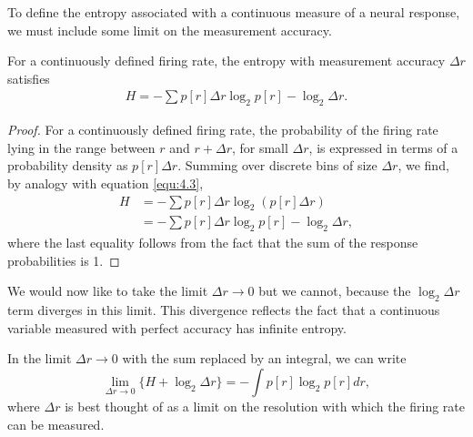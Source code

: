 \begin{rem}
  To define the entropy associated with a continuous measure of a neural response, we must include some limit on the measurement accuracy.
\end{rem}


\begin{prop}
  For a continuously defined firing rate, the entropy with measurement accuracy $\Delta r$ satisfies
  \begin{equation}
    \label{equ:4.16}
    \begin{aligned}
      H = -\sum{p[r]\Delta r\log_2p[r]}-\log_2\Delta r.  
    \end{aligned}
  \end{equation}
  \begin{proof}
    For a continuously defined firing rate, the probability of the firing rate lying in the range between $r$ and $r+\Delta r$, for small $\Delta r$, is expressed in terms of a probability density as $p[r]\Delta r$. Summing over discrete bins of size $\Delta r$, we find, by analogy with equation \ref{equ:4.3},
    \begin{displaymath}
      \begin{aligned}
        H&= -\sum{p[r]\Delta r\log_2(p[r]\Delta r)}\\
        &= -\sum{p[r]\Delta r\log_2p[r]}-\log_2\Delta r,
      \end{aligned}
    \end{displaymath}
    where the last equality follows from the fact that the sum of the response probabilities is 1.
  \end{proof}
\end{prop}

\begin{rem}
  We would now like to take the limit $\Delta r \rightarrow 0$ but we
cannot, because the $\log_2\Delta r$ term diverges in this limit. This divergence reflects the fact that a continuous variable measured with perfect accuracy has infinite entropy.
\end{rem}



\begin{thm}
  In the limit $\Delta r\to 0$ with the sum replaced by an integral, we can write
  \begin{equation}
    \label{equ:4.17}
    \lim\limits_{\Delta r\to 0}\{H+\log_2\Delta r\}=-\int{p[r]\log_2p[r]dr},
  \end{equation}
  where $\Delta r$ is best thought of as a limit on the resolution with which the firing rate can be measured.
\end{thm}

